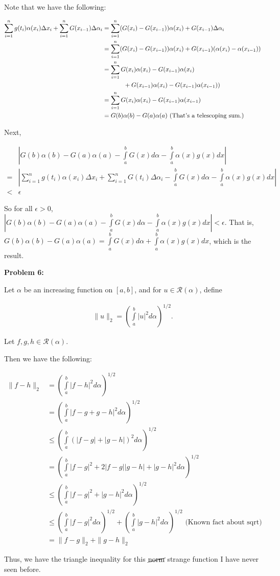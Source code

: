 \documentclass[a4paper,12pt]{article}
\newcommand{\tab}{\hspace{4mm}} %
\newcommand{\shunt}{\vspace{20mm}}
\newcommand{\absval}[1]{\left\lvert #1 \right\rvert}
\newcommand{\norm}[1]{\|#1\|}
\newcommand{\al}{\alpha} %
\newcommand{\De}{\Delta}
\newcommand{\ep}{\epsilon}
\newcommand{\scrR}{\mathcal{R}}
\begin{document}
Note that we have the following:

\begin{align*}
\sum\limits_{i=1}^n g(t_i)\al(x_i) \Delta x_i + \sum\limits_{i=1}^n G(x_{i-1})\Delta \al_i &= \sum\limits_{i=1}^n (G(x_i)-G(x_{i-1})) \al(x_i) + G(x_{i-1}) \De \al_i \\
&= \sum\limits_{i=1}^n (G(x_i)-G(x_{i-1}))\al(x_i) + G(x_{i-1})(\al(x_i)-\al(x_{i-1})) \\
&= \sum\limits_{i=1}^n G(x_i)\al(x_i)-G(x_{i-1})\al(x_i) \\
& \tab \tab \tab + G(x_{i-1})\al(x_i)-G(x_{i-1})\al(x_{i-1})) \\
&= \sum\limits_{i=1}^n G(x_i)\al(x_i)-G(x_{i-1})\al(x_{i-1}) \\
&= G(b)\al(b) - G(a)\al(a) \text{ (That's a telescoping sum.)}
\end{align*}

Next,

\begin{align*}
&\absval{G(b)\al(b)-G(a)\al(a)- \int\limits_a^b G(x)d\al - \int\limits_a^b \al(x)g(x)dx} \\
=& \absval{\sum\limits_{i=1}^n g(t_i)\al(x_i) \Delta x_i + \sum\limits_{i=1}^n G(t_i)\Delta \al_i - \int\limits_a^b G(x)d\al - \int\limits_a^b \al(x)g(x)dx} \\
<& \ep
\end{align*}

So for all $\ep >0$, $\absval{G(b)\al(b)-G(a)\al(a)- \int\limits_a^b G(x)d\al - \int\limits_a^b \al(x)g(x)dx} < \ep$. That is, $G(b)\al(b)-G(a)\al(a) =  \int\limits_a^b G(x)d\al + \int\limits_a^b \al(x)g(x)dx$, which is the result.

\shunt

{\bf Problem 6:}

Let $\al$ be an increasing function on $[a,b]$, and for $u \in \scrR (\al)$, define

\begin{align*}
\norm{u}_2 = \left(\int\limits_a^b \absval{u}^2 d\al \right)^{1/2}.
\end{align*}

Let $f,g,h \in \scrR(\al)$.

Then we have the following:

\begin{align*}
\norm{f-h}_2 &= \left(\int\limits_a^b \absval{f-h}^2 d\al \right)^{1/2}\\
&= \left(\int\limits_a^b \absval{f-g+g-h}^2 d\al \right)^{1/2}\\
&\leq \left(\int\limits_a^b (\absval{f-g} + \absval{g-h})^2 d\al \right)^{1/2}\\
&= \left(\int\limits_a^b \absval{f-g}^2 + 2\absval{f-g}\absval{g-h} + \absval{g-h}^2 d\al \right)^{1/2}\\
&\leq \left(\int\limits_a^b \absval{f-g}^2 + \absval{g-h}^2 d\al \right)^{1/2}\\
&\leq \left(\int\limits_a^b \absval{f-g}^2 d\al \right)^{1/2} + \left(\int\limits_a^b\absval{g-h}^2 d\al \right)^{1/2} \text{ (Known fact about sqrt)}\\
&= \norm{f-g}_2 + \norm{g-h}_2
\end{align*}

Thus, we have the triangle inequality for this $\cancel{\text{norm}}$ strange function I have never seen before.

\shunt
\end{document}
